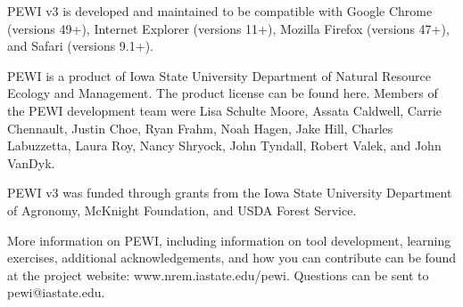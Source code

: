 \documentclass[11pt]{article}
\begin{document}
PEWI v3 is developed and maintained to be compatible with Google Chrome (versions 49+), Internet Explorer (versions 11+), Mozilla Firefox (versions 47+), and Safari (versions 9.1+).

PEWI is a product of Iowa State University Department of Natural Resource Ecology and Management. The product license can be found here. Members of the PEWI development team were Lisa Schulte Moore, Assata Caldwell, Carrie Chennault, Justin Choe, Ryan Frahm, Noah Hagen, Jake Hill, Charles Labuzzetta, Laura Roy, Nancy Shryock, John Tyndall, Robert Valek, and John VanDyk.

PEWI v3 was funded through grants from the Iowa State University Department of Agronomy, McKnight Foundation, and USDA Forest Service.

More information on PEWI, including information on tool development, learning exercises, additional acknowledgements, and how you can contribute can be found at the project website: www.nrem.iastate.edu/pewi. Questions can be sent to pewi@iastate.edu. 
\end{document}
